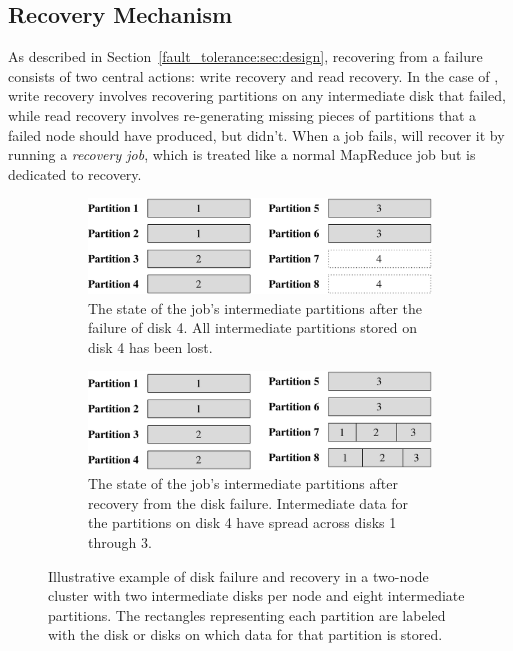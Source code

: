 \subsection{Recovery Mechanism}
\label{sec:recovery}

As described in Section~\ref{fault_tolerance:sec:design}, recovering from a
failure consists of two central actions: write recovery and read recovery. In
the case of \themis, write recovery involves recovering partitions on any
intermediate disk that failed, while read recovery involves re-generating
missing pieces of partitions that a failed node should have produced, but
didn't. When a job fails, \themis will recover it by running a \emph{recovery
  job}, which is treated like a normal MapReduce job but is dedicated to
recovery.

\begin{figure}
  \centering
  \begin{subfigure}[t]{\columnwidth}
    \centering
    \includegraphics[width=\textwidth]{fault_tolerance/figures/disk_failure_before_recovery}
    \caption{\label{fig:disk_fail_before} The state of the job's intermediate
      partitions after the failure of disk 4. All intermediate partitions
      stored on disk 4 has been lost.}
  \end{subfigure}\hspace{0.05\textwidth}
  \begin{subfigure}[t]{\columnwidth}
    \centering
    \includegraphics[width=\textwidth]{fault_tolerance/figures/disk_failure_after_recovery}
    \caption{\label{fig:disk_fail_after} The state of the job's intermediate
      partitions after recovery from the disk failure. Intermediate data for
      the partitions on disk 4 have spread across disks 1 through 3.}
  \end{subfigure}
  \caption{\label{fig:disk_fail} Illustrative example of disk failure and
    recovery in a two-node cluster with two intermediate disks per node and
    eight intermediate partitions. The rectangles
    representing each partition are labeled with the disk or disks on which
    data for that partition is stored.}
\end{figure}

